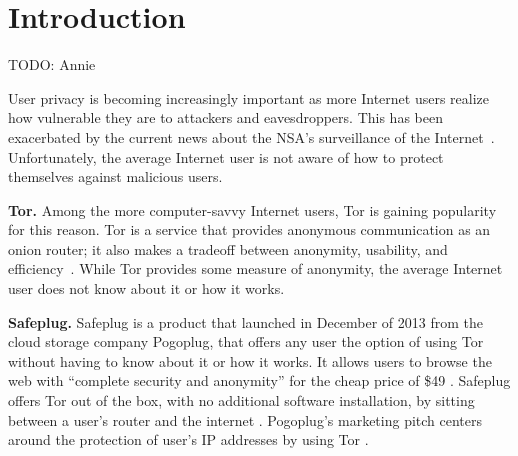 \section{Introduction}
\label{sec:intro}

TODO: Annie

User privacy is becoming increasingly important as more Internet users realize how vulnerable they are to attackers and eavesdroppers.  This has been exacerbated by the current news about the NSA's surveillance of the Internet~\cite{nsa}.  Unfortunately, the average Internet user is not aware of how to protect themselves against malicious users.     

{\bf Tor.} Among the more computer-savvy Internet users, Tor is gaining popularity for this reason.  Tor is a service that provides anonymous communication as an onion router; it also makes a tradeoff between anonymity, usability, and efficiency~\cite{tor}.  While Tor provides some measure of anonymity, the average Internet user does not know about it or how it works.  

{\bf Safeplug.} Safeplug is a product that launched in December of 2013 from the cloud storage company Pogoplug, that offers any user the option of using Tor without having to know about it or how it works.  It allows users to browse the web with “complete security and anonymity” for the cheap price of \$49 \cite{safeplug}.  Safeplug offers Tor out of the box, with no additional software installation, by sitting between a user’s router and the internet \cite{wired}.  Pogoplug’s marketing pitch centers around the protection of user’s IP addresses by using Tor \cite{safeplug,bittech}.
